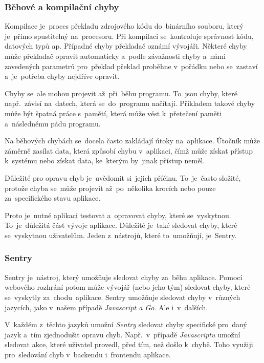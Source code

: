 \documentclass[14pt]{article}
\begin{document}
            \subsubsection{Běhové a kompilační chyby}
            Kompilace je~proces překladu zdrojového kódu do~binárního souboru, který je~přímo spustitelný na~procesoru.
            Při kompilaci se~kontroluje správnost kódu, datových typů ap. Případné chyby překladač oznámí vývojáři.
            Některé chyby může překladač opravit automaticky a~podle závažnosti chyby a~námi zavedených parametrů pro~překlad
            překlad proběhne v~pořádku nebo se~zastaví a~je~potřeba chyby nejdříve opravit.

            Chyby se~ale mohou projevit až~při~běhu programu. To~jsou chyby, které např.~závisí na~datech, která se~do~programu načítají.
            Příkladem takové chyby může být špatná práce s~pamětí, která může vést k~přetečení paměti a~následnému pádu programu.

            Na běhových chybách se~docela často zakládají útoky na~aplikace. Útočník může záměrně zasílat data, která způsobí chybu v~aplikaci,
            čímž může získat přístup k~systému nebo získat data, ke~kterým by~jinak přístup neměl.

            Důležité pro opravu chyb je~uvědomit si~jejich příčinu. To~je~často složité, protože chyba se~může projevit až~po~několika krocích nebo pouze za~specifického stavu aplikace.

            Proto je~nutné aplikaci testovat a~opravovat chyby, které se~vyskytnou. To~je~důležitá část vývoje aplikace. Důležité je~také sledovat
            chyby, které se~vyskytnou uživatelům. Jeden z~nástrojů, které to~umožňují, je~Sentry.

            \subsubsection{Sentry}
            Sentry je~nástroj, který umožňuje sledovat chyby za~běhu aplikace.
            Pomocí webového rozhrání potom může vývojář (nebo jeho tým) sledovat chyby, které se~vyskytly za~chodu~aplikace.
            Sentry umožňuje sledovat chyby v~různých jazycích, jako v~našem případě \emph{Javascript a Go}. Ale i~v~dalších.


            V~každém z~těchto jazyků umožní \emph{Sentry} sledovat chyby specifické pro~daný jazyk a~tím zjednodušit opravu chyb.
            Např.~v~případě \emph{Javascriptu} umožní sledovat akce, které uživatel provedl, před tím, než došlo k~chybě. 
            Toho využiji pro~sledování chyb v~backendu i~frontendu aplikace.
\end{document}
